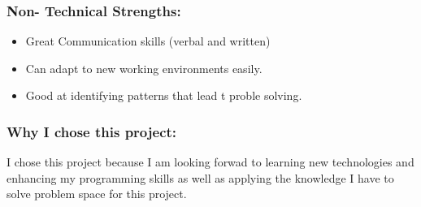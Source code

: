 \subsubsection{Non- Technical Strengths:}
\begin{itemize}
		\item Great Communication skills (verbal and written)
		\item Can adapt to new working environments easily.
		\item Good at identifying patterns that lead t proble solving.
\end{itemize}
\subsubsection{Why I chose this project:}
\par{I chose this project because I am looking forwad to learning new technologies and enhancing my programming skills as well as applying the knowledge I have to solve problem space for this project.}
\newpage